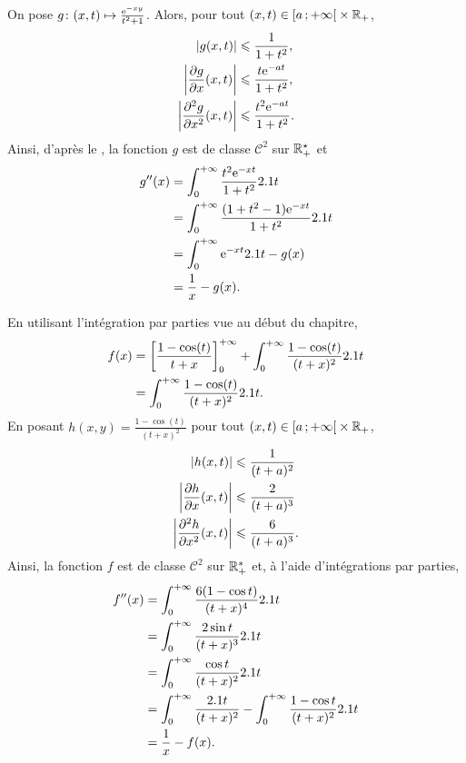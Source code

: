 \begin{solution}
\begin{reponses}
\item On pose $\fonctionligne[g]{(x, t)}{\frac{\e^{-x y}}{t^2 + 1}}$. Alors, pour tout $(x, t) \in \interfo{a}{+\infty} \times \Rp$,
\begin{align*}
\abs{g(x, t)} &\leqslant \frac{1}{1 + t^2},\\
\abs{\frac{\partial g}{\partial x}(x, t)} &\leqslant \frac{t \e^{-a t}}{1 + t^2},\\
\abs{\frac{\partial^2 g}{\partial x^2}(x, t)} &\leqslant \frac{t^2 \e^{-a t}}{1 + t^2}.
\end{align*}
Ainsi, d'après le , la fonction $g$ est de classe $\mathscr{C}^2$ sur $\Rpe$ et
\begin{align*}
g''(x)
&= \int_0^{+\infty} \frac{t^2 \e^{-x t}}{1 + t^2} \d t\\
&= \int_0^{+\infty} \frac{(1 + t^2 - 1) \e^{-x t}}{1 + t^2} \d t\\
&= \int_0^{+\infty} \e^{-x t} \d t - g(x)\\
&= \frac{1}{x} - g(x).
\end{align*}

\item En utilisant l'intégration par parties vue au début du chapitre,
\begin{align*}
f(x)
&= \left[\frac{1 - \cos(t)}{t + x}\right]_0^{+\infty} + \int_0^{+\infty} \frac{1 - \cos(t)}{(t + x)^2} \d t\\
&= \int_0^{+\infty} \frac{1 - \cos(t)}{(t + x)^2} \d t.
\end{align*}
En posant $h(x, y) = \frac{1 - \cos(t)}{(t + x)^2}$ pour tout $(x, t) \in \interfo{a}{+\infty} \times \Rp$,
\begin{align*}
\abs{h(x, t)} &\leqslant \frac{1}{(t + a)^2}\\
\abs{\frac{\partial h}{\partial x}(x, t)} &\leqslant \frac{2}{(t + a)^3}\\
\abs{\frac{\partial^2 h}{\partial x^2}(x, t)} &\leqslant \frac{6}{(t + a)^3}.
\end{align*}
Ainsi, la fonction $f$ est de classe $\mathscr{C}^2$ sur $\R_+^*$ et, à l'aide d'intégrations par parties,
\begin{align*}
f''(x)
&= \int_0^{+\infty} \frac{6 (1 - \cos t)}{(t + x)^4} \d t\\
&= \int_0^{+\infty} \frac{2 \sin t}{(t + x)^3} \d t\\
&= \int_0^{+\infty} \frac{\cos t}{(t + x)^2} \d t\\
&= \int_0^{+\infty} \frac{\d t}{(t + x)^2} - \int_0^{+\infty} \frac{1 - \cos t}{(t + x)^2} \d t\\
&= \frac{1}{x} - f(x).
\end{align*}


\end{reponses}
\end{solution}
